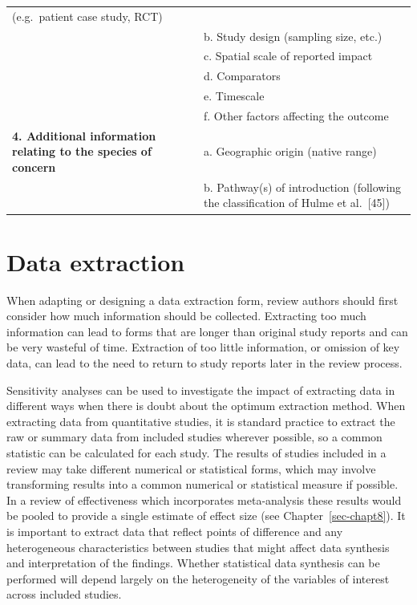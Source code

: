\documentclass[
  letterpaper,
  DIV=11,
  numbers=noendperiod]{scrreprt}
\begin{document}
\begin{longtable}[]{@{}
  >{\raggedright\arraybackslash}p{}
  >{\raggedright\arraybackslash}p{}@{}}
(e.g.~patient case study, RCT) \\
& b. Study design (sampling size, etc.) \\
& c. Spatial scale of reported impact \\
& d. Comparators \\
& e. Timescale \\
& f. Other factors affecting the outcome \\
\textbf{4. Additional information relating to the species of concern} &
a. Geographic origin (native range) \\
& b. Pathway(s) of introduction (following the classification of Hulme
et al.~{[}45{]}) \\
\end{longtable}

\section{Data extraction}\label{data-extraction}

When adapting or designing a data extraction form, review authors should
first consider how much information should be collected. Extracting too
much information can lead to forms that are longer than original study
reports and can be very wasteful of time. Extraction of too little
information, or omission of key data, can lead to the need to return to
study reports later in the review process.

Sensitivity analyses can be used to investigate the impact of extracting
data in different ways when there is doubt about the optimum extraction
method. When extracting data from quantitative studies, it is standard
practice to extract the raw or summary data from included studies
wherever possible, so a common statistic can be calculated for each
study. The results of studies included in a review may take different
numerical or statistical forms, which may involve transforming results
into a common numerical or statistical measure if possible. In a review
of effectiveness which incorporates meta-analysis these results would be
pooled to provide a single estimate of effect size (see
Chapter~\ref{sec-chapt8}). It is important to extract data that reflect
points of difference and any heterogeneous characteristics between
studies that might affect data synthesis and interpretation of the
findings. Whether statistical data synthesis can be performed will
depend largely on the heterogeneity of the variables of interest across
included studies.
\end{document}
